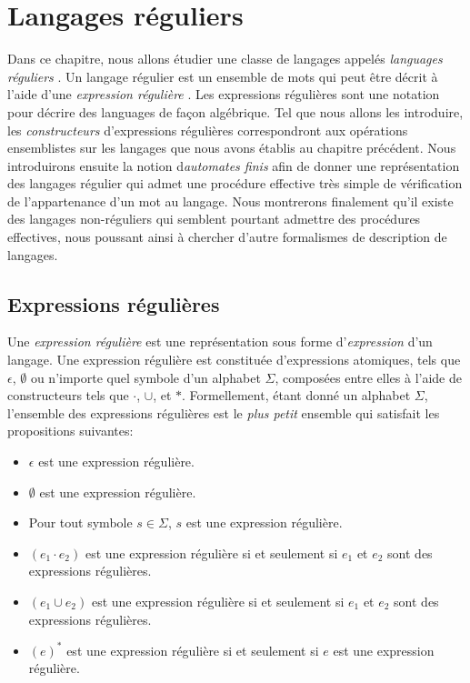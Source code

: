 \chapter{Langages réguliers}

Dans ce chapitre, nous allons étudier une classe de langages appelés \og \textit{languages réguliers} \fg{}.
Un langage régulier est un ensemble de mots qui peut être décrit à l'aide d'une \og \textit{expression régulière} \fg{}.
Les expressions régulières sont une notation pour décrire des languages de façon algébrique.
Tel que nous allons les introduire, les \og \textit{constructeurs} \fg{} d'expressions régulières correspondront aux opérations ensemblistes sur les langages que nous avons établis au chapitre précédent.
Nous introduirons ensuite la notion d\og \textit{automates finis} \fg{} afin de donner une représentation des langages régulier qui admet une procédure effective très simple de vérification de l'appartenance d'un mot au langage.
Nous montrerons finalement qu'il existe des langages non-réguliers qui semblent pourtant admettre des procédures effectives, nous poussant ainsi à chercher d'autre formalismes de description de langages.

\section{Expressions régulières}

Une \og \textit{expression régulière} \fg{} est une représentation sous forme d'\textit{expression} d'un langage.
Une expression régulière est constituée d'expressions atomiques, tels que $\epsilon$, $\emptyset$ ou n'importe quel symbole d'un alphabet $\Sigma$, composées entre elles à l'aide de constructeurs tels que $\cdot$, $\cup$, et $*$. Formellement, étant donné un alphabet $\Sigma$, l'ensemble des expressions régulières est le \textit{plus petit} ensemble qui satisfait les propositions suivantes:
\begin{itemize}
\item $\epsilon$ est une expression régulière.
\item $\emptyset$ est une expression régulière.
\item Pour tout symbole $s \in \Sigma$, $s$ est une expression régulière.
\item $(e_1 \cdot e_2)$ est une expression régulière si et seulement si $e_1$ et $e_2$ sont des expressions régulières.
\item $(e_1 \cup e_2)$ est une expression régulière si et seulement si $e_1$ et $e_2$ sont des expressions régulières.
\item $(e)^*$ est une expression régulière si et seulement si $e$ est une expression régulière.
\end{itemize}

